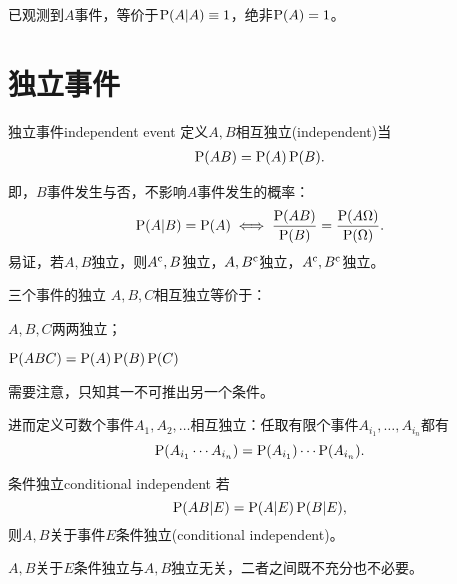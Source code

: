 已观测到$A$事件，等价于$\P(A|A)\equiv 1$，绝非$\P(A)=1$。

\section{独立事件}
\begin{definition}{独立事件}{independent event}
	定义$A,B$相互独立(independent)当
	\begin{align}
		\P(AB)=\P(A)\P(B).
	\end{align}
\end{definition}
即，$B$事件发生与否，不影响$A$事件发生的概率：
\[
	\P(A|B)=\P(A)\iff\frac{\P(AB)}{\P(B)}=\frac{\P(A\Omega)}{\P(\Omega)}.
\]
易证，若$A,B$独立，则$A\c,B$独立，$A,B\c$独立，$A\c,B\c$独立。
\begin{definition}{三个事件的独立}{}
	$A,B,C$相互独立等价于：
	\begin{compactenum}
		\item $A,B,C$两两独立；
		\item $\P(ABC)=\P(A)\P(B)\P(C)$
	\end{compactenum}
\end{definition}
需要注意，只知其一不可推出另一个条件。

进而定义可数个事件$A_1,A_2,\ldots$相互独立：任取有限个事件$A_{i_1},\ldots,A_{i_n}$都有
\[
	\P(A_{i_1}\cdots A_{i_n})=\P(A_{i_1})\cdots\P(A_{i_n}).
\]
\begin{definition}{条件独立}{conditional independent}
	若
	\[
		\P(AB|E)=\P(A|E)\P(B|E),
	\]
	则$A,B$关于事件$E$条件独立(conditional independent)。
\end{definition}
$A,B$关于$E$条件独立与$A,B$独立无关，二者之间既不充分也不必要。
